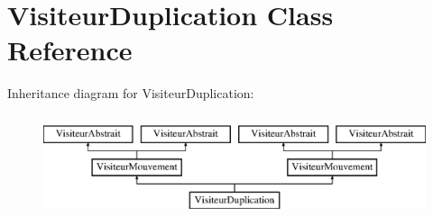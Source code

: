 \hypertarget{class_visiteur_duplication}{\section{Visiteur\-Duplication Class Reference}
\label{class_visiteur_duplication}
}
Inheritance diagram for Visiteur\-Duplication\-:\begin{figure}[H]
\begin{center}
\leavevmode
\includegraphics[height=3.000000cm]{class_visiteur_duplication}
\end{center}
\end{figure}
